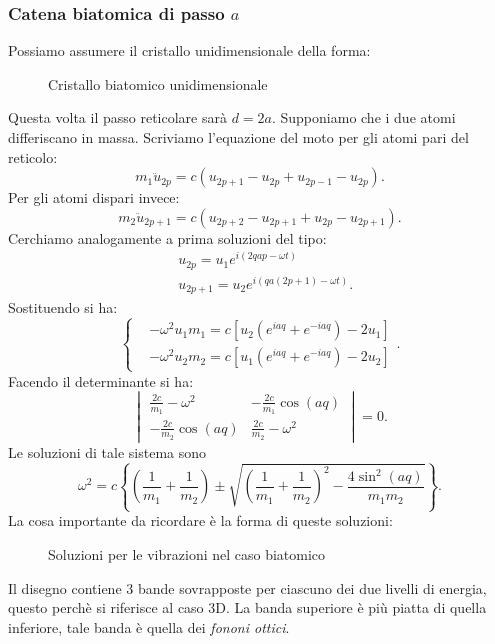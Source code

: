 \subsubsection{Catena biatomica di passo $a$}
\label{subsubsec:Catena biatomica di passo $a$}
Possiamo assumere il cristallo unidimensionale della forma:
\begin{figure}[H]
    \centering
    \caption{Cristallo biatomico unidimensionale}
    \label{fig:cristallo-biatomico-unidimensionale}
\end{figure}
\noindent 
Questa volta il passo reticolare sarà $d = 2a$. Supponiamo che i due atomi differiscano in massa.
Scriviamo l'equazione del moto per gli atomi pari del reticolo:
\[
	m_1 \ddot{u}_{2p} 
	=
	c \left( u_{2p +1} - u_{2p} + u_{2p -1} - u_{2p} \right) 
.\] 
Per gli atomi dispari invece:
\[
	m_2 \ddot{u}_{2p+1} 
	=
	c \left( u_{2p +2} - u_{2p+1} + u_{2p} - u_{2p+1} \right) 
.\] 
Cerchiamo analogamente a prima soluzioni del tipo:
\[\begin{aligned}
	&u_{2p} = u_1 e^{i\left( 2qap -\omega t \right) }\\
	&u_{2p+1} = u_2 e^{i\left( qa\left( 2p+1 \right)  -\omega t \right) }
.\end{aligned}\]
Sostituendo si ha:
\[
	\begin{cases}
		&-\omega^2u_1m_1= c\left[u_2\left(e^{iaq}+e^{-iaq}\right)-2 u_1 \right] \\
		&-\omega^2u_2m_2= c\left[u_1\left(e^{iaq}+e^{-iaq}\right)-2 u_2 \right] 
	\end{cases}
.\] 
Facendo il determinante si ha:
\[
	\begin{vmatrix}
		\frac{2c}{m_1}-\omega ^2 & - \frac{2c}{m_1} \cos(aq) \\
		-\frac{2c}{m_2}\cos(aq) & \frac{2c}{m_2} - \omega ^2
	\end{vmatrix}
	= 0
.\] 
Le soluzioni di tale sistema sono 
\[
	\omega ^2 
	=
	c\left\{ \left( \frac{1}{m_1} + \frac{1}{m_2} \right) 
	\pm \sqrt{\left( \frac{1}{m_1} + \frac{1}{m_2} \right) ^2 
	-\frac{4\sin^2(aq)}{m_1m_2} }  \right\} 
.\] 
La cosa importante da ricordare è la forma di queste soluzioni:
\begin{figure}[H]
    \centering
    \caption{Soluzioni per le vibrazioni nel caso biatomico}
    \label{fig:soluzioni-per-le-vibrazioni-nel-caso-biatomico}
\end{figure}
\noindent
Il disegno contiene 3 bande sovrapposte per ciascuno dei due livelli di energia, questo perchè si riferisce al caso 3D. La banda superiore è più piatta di quella inferiore, tale banda è quella dei \textit{fononi ottici}. \\
